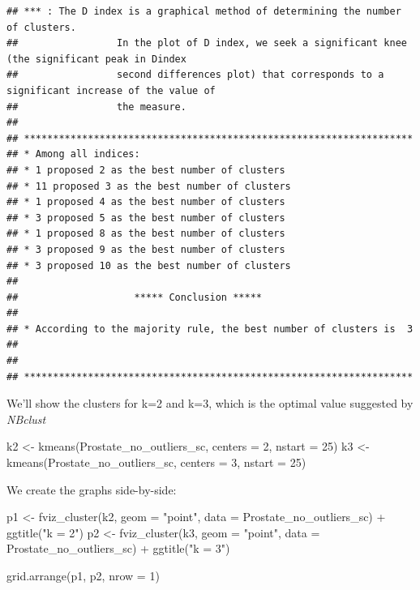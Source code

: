 \documentclass[
]{article}
\newenvironment{Shaded}{\begin{snugshade}}{\end{snugshade}}
\newcommand{\AttributeTok}[1]{\textcolor[rgb]{0.77,0.63,0.00}{#1}}
\newcommand{\DecValTok}[1]{\textcolor[rgb]{0.00,0.00,0.81}{#1}}
\newcommand{\FunctionTok}[1]{\textcolor[rgb]{0.00,0.00,0.00}{#1}}
\newcommand{\NormalTok}[1]{#1}
\newcommand{\OtherTok}[1]{\textcolor[rgb]{0.56,0.35,0.01}{#1}}
\newcommand{\SpecialCharTok}[1]{\textcolor[rgb]{0.00,0.00,0.00}{#1}}
\newcommand{\StringTok}[1]{\textcolor[rgb]{0.31,0.60,0.02}{#1}}
\begin{document}
\begin{verbatim}
## *** : The D index is a graphical method of determining the number of clusters. 
##                 In the plot of D index, we seek a significant knee (the significant peak in Dindex
##                 second differences plot) that corresponds to a significant increase of the value of
##                 the measure. 
##  
## ******************************************************************* 
## * Among all indices:                                                
## * 1 proposed 2 as the best number of clusters 
## * 11 proposed 3 as the best number of clusters 
## * 1 proposed 4 as the best number of clusters 
## * 3 proposed 5 as the best number of clusters 
## * 1 proposed 8 as the best number of clusters 
## * 3 proposed 9 as the best number of clusters 
## * 3 proposed 10 as the best number of clusters 
## 
##                    ***** Conclusion *****                            
##  
## * According to the majority rule, the best number of clusters is  3 
##  
##  
## *******************************************************************
\end{verbatim}

We'll show the clusters for k=2 and k=3, which is the optimal value
suggested by \emph{NBclust}

\begin{Shaded}
\begin{Highlighting}[]
\NormalTok{k2 }\OtherTok{\textless{}{-}} \FunctionTok{kmeans}\NormalTok{(Prostate\_no\_outliers\_sc, }\AttributeTok{centers =} \DecValTok{2}\NormalTok{, }\AttributeTok{nstart =} \DecValTok{25}\NormalTok{)}
\NormalTok{k3 }\OtherTok{\textless{}{-}} \FunctionTok{kmeans}\NormalTok{(Prostate\_no\_outliers\_sc, }\AttributeTok{centers =} \DecValTok{3}\NormalTok{, }\AttributeTok{nstart =} \DecValTok{25}\NormalTok{)}
\end{Highlighting}
\end{Shaded}

We create the graphs side-by-side:

\begin{Shaded}
\begin{Highlighting}[]
\NormalTok{p1 }\OtherTok{\textless{}{-}} \FunctionTok{fviz\_cluster}\NormalTok{(k2, }\AttributeTok{geom =} \StringTok{"point"}\NormalTok{, }\AttributeTok{data =}\NormalTok{ Prostate\_no\_outliers\_sc) }\SpecialCharTok{+} \FunctionTok{ggtitle}\NormalTok{(}\StringTok{"k = 2"}\NormalTok{)}
\NormalTok{p2 }\OtherTok{\textless{}{-}} \FunctionTok{fviz\_cluster}\NormalTok{(k3, }\AttributeTok{geom =} \StringTok{"point"}\NormalTok{,  }\AttributeTok{data =}\NormalTok{ Prostate\_no\_outliers\_sc) }\SpecialCharTok{+} \FunctionTok{ggtitle}\NormalTok{(}\StringTok{"k = 3"}\NormalTok{)}

\FunctionTok{grid.arrange}\NormalTok{(p1, p2, }\AttributeTok{nrow =} \DecValTok{1}\NormalTok{)}
\end{Highlighting}
\end{Shaded}
\end{document}
